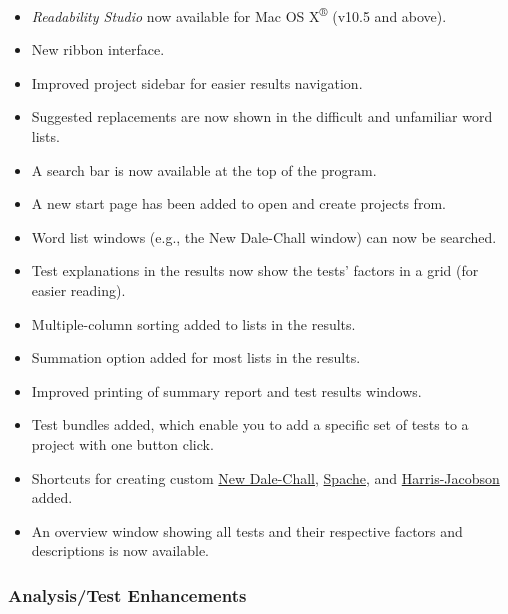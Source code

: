 \documentclass[
]{book}
\providecommand{\tightlist}{%
  \setlength{\itemsep}{0pt}\setlength{\parskip}{0pt}}
\theoremstyle{definition}
\theoremstyle{definition}
\theoremstyle{definition}
\theoremstyle{definition}
\theoremstyle{remark}
\begin{document}
\begin{itemize}
\tightlist
\item
  \emph{Readability Studio} now available for Mac OS X\textsuperscript{®} (v10.5 and above).
\item
  New ribbon interface.
\item
  Improved project sidebar for easier results navigation.
\item
  Suggested replacements are now shown in the difficult and unfamiliar word lists.
\item
  A search bar is now available at the top of the program.
\item
  A new start page has been added to open and create projects from.
\item
  Word list windows (e.g., the New Dale-Chall window) can now be searched.
\item
  Test explanations in the results now show the tests' factors in a grid (for easier reading).
\item
  Multiple-column sorting added to lists in the results.
\item
  Summation option added for most lists in the results.
\item
  Improved printing of summary report and test results windows.
\item
  Test bundles added, which enable you to add a specific set of tests to a project with one button click.
\item
  Shortcuts for creating custom \protect\hyperlink{dale-chall-test}{New Dale-Chall}, \protect\hyperlink{spache-test}{Spache}, and \protect\hyperlink{harris-jacobson}{Harris-Jacobson} added.
\item
  An overview window showing all tests and their respective factors and descriptions is now available.
\end{itemize}

\hypertarget{analysistest-enhancements-3}{%
\subsubsection*{Analysis/Test Enhancements}\label{analysistest-enhancements-3}}
\end{document}
